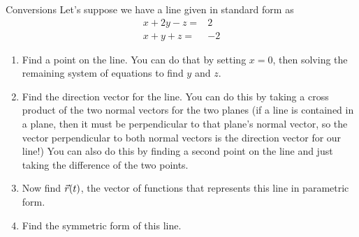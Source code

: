 \begin{exercise}{Conversions}
Let's suppose we have a line given in standard form as 
\begin{align*}
x+2y-z=&2\\
x+y+z=&-2
\end{align*}
\begin{enumerate}
\item Find a point on the line. You can do that by setting $x=0$, then solving the remaining system of equations to find $y$ and $z$.
\vspace{1em}
\item Find the direction vector for the line. You can do this by taking a cross product of the two normal vectors for the two planes (if a line is contained in a plane, then it must be perpendicular to that plane's normal vector, so the vector perpendicular to both normal vectors is the direction vector for our line!) You can also do this by finding a second point on the line and just taking the difference of the two points.
\vspace{1em}
\item Now find $\vec{r}(t)$, the vector of functions that represents this line in parametric form.
\vspace{1em}
\item Find the symmetric form of this line.
\end{enumerate}
\end{exercise}

